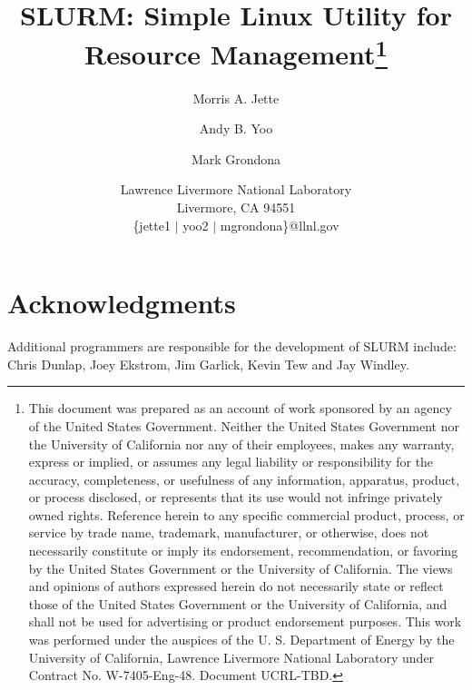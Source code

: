 \documentclass[11pt]{article}
\title{SLURM: Simple Linux Utility for Resource Management\thanks{
This document was prepared as an account of work sponsored by an
agency of the United States Government.  Neither the United States
Government nor the University of California nor any of their
employees, makes any warranty, express or implied, or assumes any
legal liability or responsibility for the accuracy, completeness, or
usefulness of any information, apparatus, product, or process
disclosed, or represents that its use would not infringe privately
owned rights. Reference herein to any specific commercial product,
process, or service by trade name, trademark, manufacturer, or
otherwise, does not necessarily constitute or imply its endorsement,
recommendation, or favoring by the United States Government or the
University of California.  The views and opinions of authors expressed
herein do not necessarily state or reflect those of the United States
Government or the University of California, and shall not be used for
advertising or product endorsement purposes.
This work was performed under the auspices of the U. S. Department of
Energy by the University of California, Lawrence Livermore National
Laboratory under Contract No. W-7405-Eng-48. Document UCRL-TBD.}}
\author{Morris A. Jette \and Andy B. Yoo \and Mark Grondona}
\date{Lawrence Livermore National Laboratory\\
Livermore, CA 94551\\
\{jette1 $\mid$ yoo2 $\mid$ mgrondona\}@llnl.gov}
\begin{document}
\maketitle







%



\section*{Acknowledgments}

Additional programmers are responsible for the development of 
SLURM include: Chris Dunlap, Joey Ekstrom, Jim Garlick, Kevin Tew
and Jay Windley.

\newpage
%
%



\end{document}
